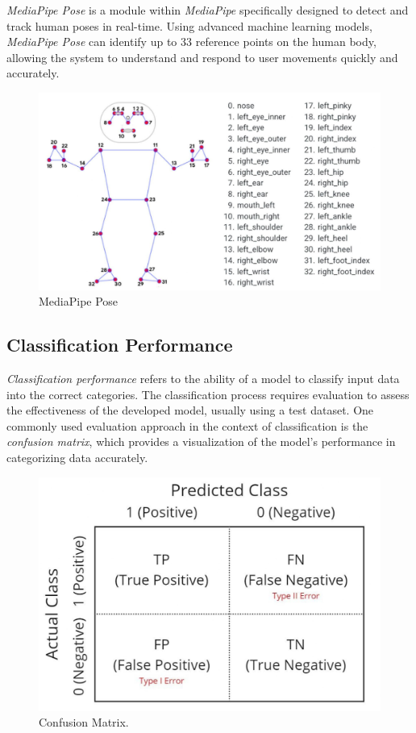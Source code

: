 \emph{MediaPipe Pose} is a module within \emph{MediaPipe} specifically designed to detect and track human poses in real-time. Using advanced machine learning models, \emph{MediaPipe Pose} can identify up to 33 reference points on the human body, allowing the system to understand and respond to user movements quickly and accurately.

\begin{figure}[H]
  \centering
  \includegraphics[scale=0.5]{gambar/mp_pose.jpg}
  \caption{MediaPipe Pose}
  \label{fig:mp_pose}
\end{figure}

\subsection{Classification Performance}
\label{subsec:Classification Performance}

\emph{Classification performance} refers to the ability of a model to classify input data into the correct categories. The classification process requires evaluation to assess the effectiveness of the developed model, usually using a test dataset. One commonly used evaluation approach in the context of classification is the \emph{confusion matrix}, which provides a visualization of the model's performance in categorizing data accurately.

\begin{figure}[H]
  \centering
  \includegraphics[scale=0.5]{gambar/Matrix Konfusi.jpg}
  \caption{Confusion Matrix.}
  \label{fig:confusion}
\end{figure}

